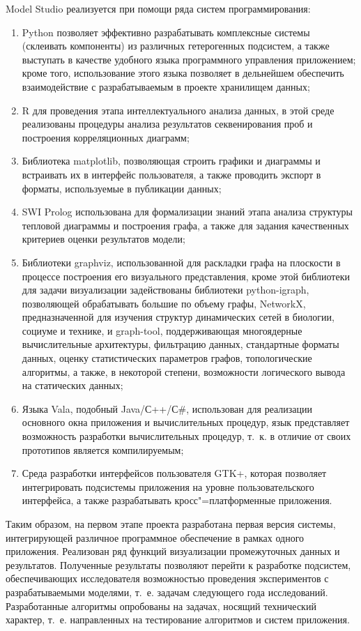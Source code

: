 \documentclass[a4paper,12pt,openany,final]{extreport}
\begin{document}
Model Studio реализуется при помощи ряда систем программирования:
\begin{enumerate}
\item Python позволяет эффективно разрабатывать комплексные системы (склеивать компоненты) из различных гетерогенных подсистем, а также выступать в качестве удобного языка программного управления приложением; кроме того, использование этого языка позволяет в дельнейшем обеспечить взаимодействие с разрабатываемым в проекте хранилищем данных;
\item R для проведения этапа интеллектуального анализа данных, в этой среде реализованы процедуры анализа результатов секвенирования проб и построения корреляционных диаграмм;
\item Библиотека matplotlib, позволяющая строить графики и диаграммы и встраивать их в интерфейс пользователя, а также проводить экспорт в форматы, используемые в публикации данных;
\item SWI Prolog использована для формализации знаний этапа анализа структуры тепловой диаграммы и построения графа, а также для задания качественных критериев оценки результатов модели;
\item Библиотеки graphviz, использованной для раскладки графа на плоскости в процессе построения его визуального представления, кроме этой библиотеки для задачи визуализации задействованы библиотеки python-igraph, позволяющей обрабатывать большие по объему графы, NetworkX, предназначенной для изучения структур динамических сетей в биологии, социуме и технике, и graph-tool, поддерживающая многоядерные вычислительные архитектуры, фильтрацию данных, стандартные форматы данных, оценку статистических параметров графов, топологические алгоритмы, а также, в некоторой степени, возможности логического вывода на статических данных;
\item Языка Vala, подобный Java/С++/С\#, использован для реализации основного окна приложения и вычислительных процедур, язык представляет возможность разработки вычислительных процедур, т.~к. в отличие от своих прототипов является компилируемым;
\item Среда разработки интерфейсов пользователя GTK+, которая позволяет интегрировать подсистемы приложения на уровне пользовательского интерфейса, а также разрабатывать кросс"=платформенные приложения.
\end{enumerate}

Таким образом, на первом этапе проекта разработана первая версия системы, интегрирующей различное программное обеспечение в рамках одного приложения. Реализован ряд функций визуализации промежуточных данных и результатов. Полученные результаты позволяют перейти к разработке подсистем, обеспечивающих исследователя возможностью проведения экспериментов с разрабатываемыми моделями, т.~е. задачам следующего года исследований. Разработанные алгоритмы опробованы на задачах, носящий технический характер, т.~е. направленных на тестирование алгоритмов и систем приложения.
\end{document}
